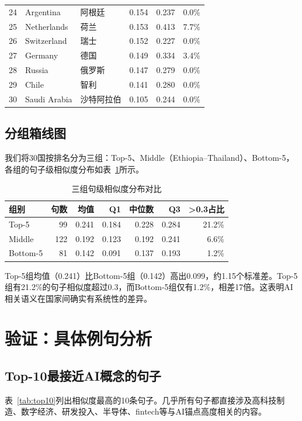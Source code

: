 \documentclass[11pt,a4paper]{article}
\begin{document}
\begin{table}[H]
\begin{tabular}{rllrrc}
24 & Argentina & 阿根廷             & 0.154 & 0.237 & 0.0\% \\
25 & Netherlands & 荷兰              & 0.153 & 0.413 & 7.7\% \\
26 & Switzerland & 瑞士              & 0.152 & 0.227 & 0.0\% \\
27 & Germany & 德国                  & 0.149 & 0.334 & 3.4\% \\
28 & Russia & 俄罗斯                 & 0.147 & 0.279 & 0.0\% \\
29 & Chile & 智利                    & 0.141 & 0.280 & 0.0\% \\
30 & Saudi Arabia & 沙特阿拉伯        & 0.105 & 0.244 & 0.0\% \\
\bottomrule
\end{tabular}
\end{table}

\subsection{分组箱线图}
我们将30国按排名分为三组：Top-5、Middle（Ethiopia--Thailand）、Bottom-5，各组的句子级相似度分布如表~\ref{tab:groups}所示。

\begin{table}[H]\centering
\caption{三组句级相似度分布对比}\label{tab:groups}
\begin{tabular}{lrrrrrr}
\toprule\textbf{组别} & \textbf{句数} & \textbf{均值} & \textbf{Q1} & \textbf{中位数} & \textbf{Q3} & \textbf{>0.3占比} \\
\midrule
Top-5      & 99  & 0.241 & 0.184 & 0.228 & 0.284 & 21.2\% \\
Middle     & 122 & 0.192 & 0.123 & 0.192 & 0.241 & 6.6\% \\
Bottom-5   & 81  & 0.142 & 0.091 & 0.137 & 0.193 & 1.2\% \\
\bottomrule
\end{tabular}
\end{table}

Top-5组均值（0.241）比Bottom-5组（0.142）高出0.099，约1.15个标准差。Top-5组有21.2\%的句子相似度超过0.3，而Bottom-5组仅有1.2\%，相差17倍。这表明AI相关语义在国家间确实有系统性的差异。

\section{验证：具体例句分析}

\subsection{Top-10最接近AI概念的句子}
表~\ref{tab:top10}列出相似度最高的10条句子。几乎所有句子都直接涉及高科技制造、数字经济、研发投入、半导体、fintech等与AI锚点高度相关的内容。
\end{document}
